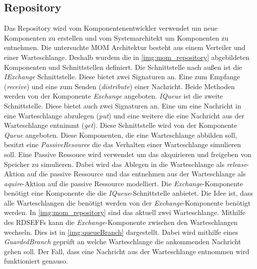 \subsection{Repository}
Das Repository wird vom Komponentenentwickler verwendet um neue Komponenten zu erstellen und vom Systemarchitekt um Komponenten zu entnehmen. Die untersuchte MOM Architektur besteht aus einem Verteiler und einer Warteschlange. Deshalb wurdem die in \autoref{img:mom_repository} abgebildeten Komponenten und Schnittstellen definiert. Die Schnittstelle nach außen ist die \emph{IExchange} Schnittstelle. Diese bietet zwei Signaturen an. Eine zum Empfange (\emph{receive}) und eine zum Senden (\emph{distribute}) einer Nachricht. Beide Methoden werden von der Komponente \emph{Exchange} angeboten. \emph{IQueue} ist die zweite Schnittstelle. Diese bietet auch zwei Signaturen an. Eine um eine Nachricht in eine Warteschlange abzulegen (\emph{put}) und eine weitere die eine Nachricht aus der Warteschlange entnimmt (\emph{get}). Diese Schnittstelle wird von der Komponente \emph{Queue} angeboten. Diese Komponenten, die eine Warteschlange abbilden soll, besitzt eine \emph{PassiveResource} die das Verhalten einer Warteschlange simulieren soll. Eine Passive Ressouce wird verwendet um das akquirieren und freigeben von Speicher zu simulieren. Dabei wird das Ablegen in die Warteschlange als \emph{release}-Aktion auf die passive Ressource und das entnehmen aus der Warteschlange als \emph{aquire}-Aktion auf die passive Ressource modelliert. Die \emph{Exchange}-Komponente benötigt eine Komponente die die \emph{IQueue}-Schnittstelle anbietet. Die Idee ist, dass alle Warteschlangen die benötigt werden von der \emph{Exchange}-Komponente benötigt werden. In \autoref{img:mom_repository} sind das aktuell zwei Warteschlange. Mithilfe des RDSEFFs kann die \emph{Exchange}-Komponente zwischen den Warteschlangen wechseln. Dies ist in \autoref{img:queueBranch} dargestellt. Dabei wird mithilfe eines \emph{GuardedBranch} geprüft an welche Warteschlange die ankommenden Nachricht gehen soll. Der Fall, dass eine Nachricht aus der Warteschlange entnommen wird funktioniert genauso. 




